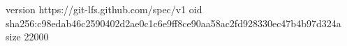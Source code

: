 version https://git-lfs.github.com/spec/v1
oid sha256:c98edab46c2590402d2ae0c1c6e9ff8ce90aa58ac2fd928330ec47b4b97d324a
size 22000
